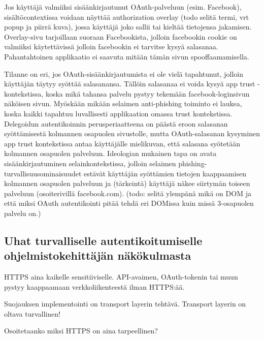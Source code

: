 \documentclass[finnish,gradu]{tktltiki}
\begin{document}

  Jos käyttäjä valmiiksi sisäänkirjautunut OAuth-palveluun (esim. Facebook), sisältöcontextissa voidaan näyttää authorization overlay (todo selitä termi, vrt popup ja piirrä kuva), jossa käyttäjä joko sallii tai kieltää tietojensa jakamisen. Overlay-sivu tarjoillaan suoraan Facebookista, jolloin facebookin cookie on valmiiksi käytettävissä jolloin facebookin ei tarvitse kysyä salasanaa. Pahantahtoinen applikaatio ei saavuta mitään tämän sivun spooffaamamisella.

  Tilanne on eri, jos OAuth-sisäänkirjautumista ei ole vielä tapahtunut, jolloin käyttäjän täytyy syöttää salasanansa. Tällöin salasanaa ei voida kysyä app trust -kontekstissa, koska mikä tahansa palvelu pystyy tekemään facebook-loginsivun näköisen sivun. Myöskään mikään selaimen anti-phishing toiminto ei laukea, koska kaikki tapahtuu luvallisesti applikaation omassa trust kontekstissa. Delegoidun autentikoinnin perusperiaatteena on päästä eroon salasanan syöttämisestä kolmannen osapuolen sivustolle, mutta OAuth-salasanan kysyminen app trust kontekstissa antaa käyttäjälle mielikuvan, että salasana syötetään kolmannen osapuolen palveluun. Ideologian mukainen tapa on avata sisäänkirjautuminen selainkontekstissa, jolloin selaimen phishing-turvallisuusominaisuudet estävät käyttäjän syöttämien tietojen kaappaamisen kolmannen osapuolen palveluun ja (tärkeintä) käyttäjä näkee siirtymän toiseen palveluun (osoiterivillä facebook.com). (todo: selitä ylempänä mikä on DOM ja että miksi OAuth autentikointi pitää tehdä eri DOMissa kuin missä 3-osapuolen palvelu on.)


  \subsection{Uhat turvalliselle autentikoitumiselle ohjelmistokehittäjän näkökulmasta} %
  \label{sec:uhat_turvalliselle_autentikoitumiselle}
    HTTPS aina kaikelle sensitiiviselle. API-avaimen, OAuth-tokenin tai muun pystyy kaappaamaan verkkoliikenteestä ilman HTTPS:ää.

    Suojauksen implementointi on transport layerin tehtävä. Transport layerin on oltava turvallinen!

    Osoitetaanko miksi HTTPS on aina tarpeellinen?
\end{document}
